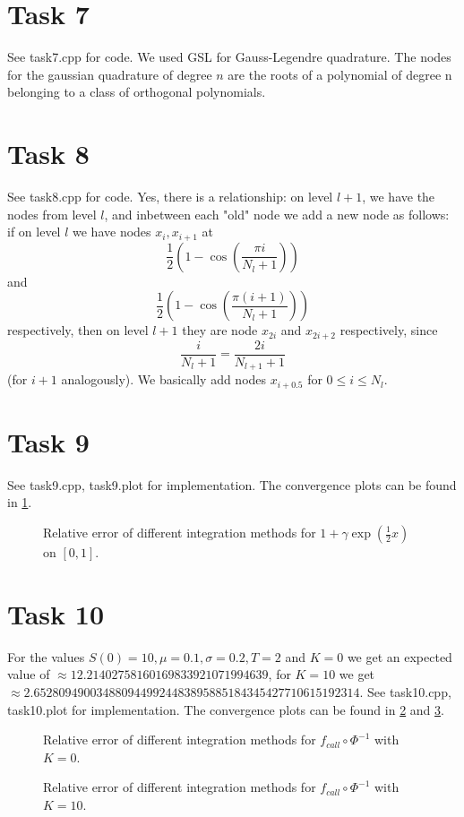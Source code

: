 \documentclass[]{article}
\begin{document}
\section*{Task 7}
See task7.cpp for code. We used GSL for Gauss-Legendre quadrature. The nodes for
the gaussian quadrature of degree $n$ are the roots of a polynomial of degree n
belonging to a class of orthogonal polynomials.

\section*{Task 8} See task8.cpp for code. Yes, there is a relationship: on level
$l+1$, we have the nodes from level $l$, and inbetween each "old" node we add a
new node as follows: if on level $l$ we have nodes $x_i,x_{i+1}$ at
\[ \dfrac{1}{2}\left(1-\cos\left(\dfrac{\pi i}{N_l+1}\right)\right)\]
 and
\[\dfrac{1}{2}\left(1-\cos\left(\dfrac{\pi(i+1)}{N_l+1}\right)\right)\]
 respectively, then on level $l+1$ they are node $x_{2i}$ and $x_{2i+2}$ respectively, since
\[\dfrac{i}{N_l+1}=\dfrac{2i}{N_{l+1}+1}\]
 (for $i+1$ analogously). We basically add nodes  $x_{i+0.5}$ for $0\le i \le
 N_l$.

\section*{Task 9}
See task9.cpp,
task9.plot for implementation. The convergence plots can be found in
\cref{fig:Task9}.

\begin{figure}[!ht]

\caption{Relative error of different integration methods for
$1+\gamma\exp\left(\frac{1}{2}x\right)$ on $\left[0,1\right]$.}
\label{fig:Task9}
\end{figure}

\section*{Task 10} For the values
$S(0)=10,\mu=0.1,\sigma=0.2,T=2$ and $K=0$ we get an expected value of $\approx
12.21402758160169833921071994639$, for $K=10$ we get $\approx
2.6528094900348809449924483895885184345427710615192314$. See task10.cpp,
task10.plot for implementation. The convergence plots can be found in
\cref{fig:Task10_0} and \cref{fig:Task10_10}.

\begin{figure}[!ht]

\caption{Relative error of different integration methods for
$f_{call}\circ \Phi^{-1}$ with $K = 0$.}
\label{fig:Task10_0}
\end{figure}

\begin{figure}[!ht]

\caption{Relative error of different integration methods for
$f_{call}\circ \Phi^{-1}$ with $K = 10$.}
\label{fig:Task10_10}
\end{figure}
\end{document}
